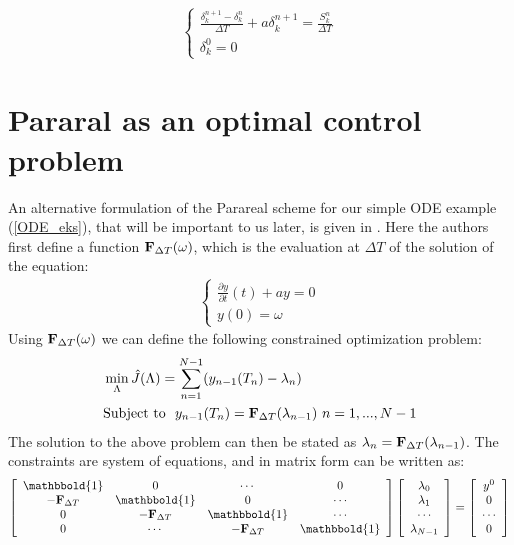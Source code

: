 \begin{align}
\left\{
     \begin{array}{lr}
		\frac{\delta_k^{n+1}-\delta_k^{n}}{\Delta T}+a\delta_k^{n+1}=\frac{S_k ^n}{\Delta T}  \\
		\delta_k^0=0
	\end{array}
\right. \label{propagator}
\end{align}
\section{Pararal as an optimal control problem}
An alternative formulation of the Parareal scheme for our simple ODE example (\ref{ODE_eks}), that will be important to us later, is given in \cite{maday2002parareal}. Here the authors first define a function $\bold F_{\Delta T}(\omega)$, which is the evaluation at $\Delta T$ of the solution of the equation:
\begin{align}
\left\{
     \begin{array}{lr}
		\frac{\partial y}{\partial t}(t)+ay=0  \\
		y(0)=\omega
	\end{array} 
\right. \label{F_operator}
\end{align}
Using $\bold F_{\Delta T}(\omega)$ we can define the following constrained optimization problem:
\begin{align*}
&\min_{\Lambda}\hat{J}(\Lambda) = \sum_{n=1}^{N-1} (y_{n-1}(T_{n})-\lambda_{n}) \\
&\textrm{Subject to } \ y_{n-1}(T_{n}) = \bold F_{\Delta T}(\lambda_{n-1}) \ n=1,...,N-1
\end{align*}
The solution to the above problem can then be stated as $\lambda_n = \bold{F}_{\Delta T}(\lambda_{n-1})$. The constraints are system of equations, and in matrix form can be written as:
\begin{align}
  \left[ \begin{array}{cccc}
   \mathbbold{1} & 0 & \cdots & 0 \\  
   -\bold{F}_{\Delta T} & \mathbbold{1} & 0 & \cdots \\ 
   0 &-\bold{F}_{\Delta T} & \mathbbold{1}  & \cdots \\
   0 &\cdots &-\bold{F}_{\Delta T} & \mathbbold{1}  \\
   \end{array}  \right] 
   \left[ \begin{array}{c}
   \lambda_0 \\
   \lambda_1 \\
   \cdots \\
   \lambda_{N-1} \\
   \end{array}  \right] =
   \left[ \begin{array}{c}
   y^0 \\
   0 \\
   \cdots \\
   0 \\
   \end{array}  \right] \label{vir_mat_form_sys }
\end{align}
